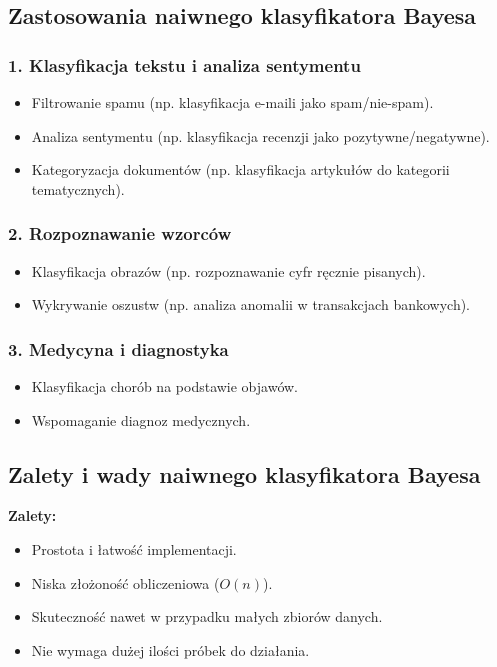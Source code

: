 \subsection{Zastosowania naiwnego klasyfikatora Bayesa}

\subsubsection{1. Klasyfikacja tekstu i analiza sentymentu}
\begin{itemize}
    \item Filtrowanie spamu (np. klasyfikacja e-maili jako spam/nie-spam).
    \item Analiza sentymentu (np. klasyfikacja recenzji jako pozytywne/negatywne).
    \item Kategoryzacja dokumentów (np. klasyfikacja artykułów do kategorii tematycznych).
\end{itemize}

\subsubsection{2. Rozpoznawanie wzorców}
\begin{itemize}
    \item Klasyfikacja obrazów (np. rozpoznawanie cyfr ręcznie pisanych).
    \item Wykrywanie oszustw (np. analiza anomalii w transakcjach bankowych).
\end{itemize}

\subsubsection{3. Medycyna i diagnostyka}
\begin{itemize}
    \item Klasyfikacja chorób na podstawie objawów.
    \item Wspomaganie diagnoz medycznych.
\end{itemize}

\subsection{Zalety i wady naiwnego klasyfikatora Bayesa}

\textbf{Zalety:}
\begin{itemize}
    \item Prostota i łatwość implementacji.
    \item Niska złożoność obliczeniowa (\( O(n) \)).
    \item Skuteczność nawet w przypadku małych zbiorów danych.
    \item Nie wymaga dużej ilości próbek do działania.
\end{itemize}

